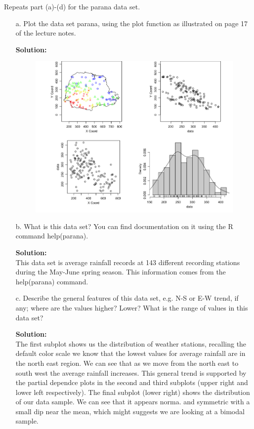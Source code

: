 \documentclass[12pt]{article}
\makeatletter
\theoremstyle{homework}
\newenvironment{exercise}[1]
{\def\@currentlabel{#1}\exercisecore}
{\endexercisecore}
\newcommand{\localhead}[1]{\par\smallskip\noindent\textbf{#1}\nobreak\\}%
\newcommand\solution{\localhead{Solution:}}
\makeatother
\begin{document}
\begin{exercise}{3} Repeats part (a)-(d) for the parana data set.\\
  \begin{enumerate}
    \item[a.] Plot the data set parana, using the plot function as illustrated on page 17 of the lecture notes.\\
    \solution  
    \begin{figure}[H]
      \begin{center}
      \includegraphics[width = \textwidth]{Rplot01.png}
      \end{center}
    \end{figure}
    \item[b.] What is this data set? You can find documentation on it using the R command help(parana).\\
    \solution This data set is average rainfall records at 143 different recording stations during the May-June spring season. 
    This information comes from the help(parana) command. 

    \item[c.]Describe the general features of this data set, e.g. N-S or E-W trend, if any; where are the values higher? Lower? What is the range of values in this 
        data set?\\ 
      \solution The first subplot shows us the distribution of weather stations, recalling the default color scale we know that the lowest values for average rainfall are 
      in the north east region. We can see that as we move from the north east to south west the average rainfall increases. This general trend is supported  by the partial dependce plots in the 
      second and third subplots (upper right and lower left respectively). The final subplot (lower right) shows the distribution of our data sample. We can see that it appears norma. and symmetric with a small
      dip near the mean, which might suggests we are looking at a bimodal sample. 


\end{enumerate}
\end{exercise}
\end{document}
